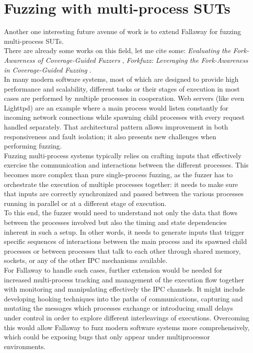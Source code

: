 \section{Fuzzing with multi-process SUTs}
Another one interesting future avenue of work is to extend Fallaway for fuzzing multi-process SUTs.
\\There are already some works on this field, let me cite some: \textit{Evaluating the Fork-Awareness of Coverage-Guided Fuzzers} \cite{icissp23}, \textit{Forkfuzz: Leveraging the Fork-Awareness in Coverage-Guided Fuzzing} \cite{forkfuzz}.
\\In many modern software systems, most of which are designed to provide high performance and scalability, different tasks or their stages of execution in most cases are performed by multiple processes in cooperation. Web servers (like even Lighttpd) are an example where a main process would listen constantly for incoming network connections while spawning child processes with every request handled separately. That architectural pattern allows improvement in both responsiveness and fault isolation; it also presents new challenges when performing fuzzing.
\\Fuzzing multi-process systems typically relies on crafting inputs that effectively exercise the communication and interactions between the different processes. This becomes more complex than pure single-process fuzzing, as the fuzzer has to orchestrate the execution of multiple processes together: it needs to make sure that inputs are correctly synchronized and passed between the various processes running in parallel or at a different stage of execution.
\\To this end, the fuzzer would need to understand not only the data that flows between the processes involved but also the timing and state dependencies inherent in such a setup. In other words, it needs to generate inputs that trigger specific sequences of interactions between the main process and its spawned child processes or between processes that talk to each other through shared memory, sockets, or any of the other IPC mechanisms available.
\\For Fallaway to handle such cases, further extension would be needed for increased multi-process tracking and management of the execution flow together with monitoring and manipulating effectively the IPC channels. It might include developing hooking techniques into the paths of communications, capturing and mutating the messages which processes exchange or introducing small delays under control in order to explore different interleavings of executions. Overcoming this would allow Fallaway to fuzz modern software systems more comprehensively, which could be exposing bugs that only appear under multiprocessor environments.